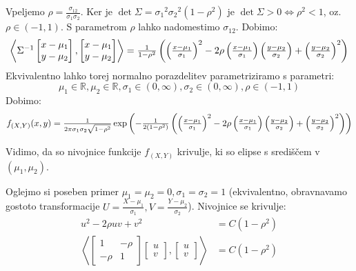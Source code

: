 \documentclass[12pt]{book}
\def\n{\noindent}
\theoremstyle{definition}
\theoremstyle{plain}
\theoremstyle{plain}
\theoremstyle{plain}
\theoremstyle{remark}
\begin{document}
\n Vpeljemo $\rho=\frac{\sigma_{12}}{\sigma_1 \sigma_2}$. Ker je $\det \Sigma=\sigma_1{ }^2 \sigma_2{ }^2\left(1-\rho^2\right)$ je $\det \Sigma >0 \iff \rho^2<1$, oz. $\rho \in(-1,1)$. S parametrom $\rho$ lahko nadomestimo $\sigma_{12}$. Dobimo: 
$$
\scalebox{1}{$\left\langle\Sigma^{-1}\begin{bmatrix} x - \mu_1 \\ y - \mu_2 \end{bmatrix},\begin{bmatrix} x - \mu_1 \\ y - \mu_2 \end{bmatrix}\right\rangle = \frac{1}{1-\rho^2}\left(\left(\frac{x-\mu_1}{\sigma_1}\right)^2-2 \rho\left(\frac{x-\mu_1}{\sigma_1}\right)\left(\frac{y-\mu_2}{\sigma_2}\right)+\left(\frac{y-\mu_2}{\sigma_2}\right)^2\right)$}
$$
Ekvivalentno lahko torej normalno porazdelitev parametriziramo s parametri:
$$
\mu_1 \in \mathbb{R}, \mu_2 \in \mathbb{R}, \sigma_1 \in(0, \infty), \sigma_2 \in(0, \infty), \rho \in(-1,1)
$$
Dobimo: 
$$
\scalebox{1}{$f_{(X, Y)}(x, y)=\frac{1}{2 \pi \sigma_1 \sigma_2 \sqrt{1-\rho^2}} \exp\left(-\frac{1}{2\left(1-\rho^2\right)}\left(\left(\frac{x-\mu_1}{\sigma_1}\right)^2-2 \rho\left(\frac{x-\mu_1}{\sigma_1}\right)\left(\frac{y-\mu_2}{\sigma_2}\right)+\left(\frac{y-\mu_2}{\sigma_2}\right)^2\right)\right)$}
$$

\n Vidimo, da so nivojnice funkcije $f_{(X,Y)}$ krivulje, ki so elipse s središčem v $(\mu_1, \mu_2)$.

\n Oglejmo si poseben primer $\mu_1=\mu_2=0, \sigma_1=\sigma_2=1$ (ekvivalentno, obravnavamo gostoto transformacije $U=\frac{X-\mu_1}{\sigma_1}, V=\frac{Y-\mu_2}{\sigma_2}$). Nivojnice se krivulje: 
$$
\begin{aligned}
    u^2-2 \rho u v+v^2&=C\left(1-\rho^2\right) \\ 
    \left\langle\begin{bmatrix} 1 & -\rho \\ -\rho & 1 \end{bmatrix} \begin{bmatrix} u \\ v \end{bmatrix},\begin{bmatrix} u \\ v \end{bmatrix}\right\rangle&=C\left(1-\rho^2\right)
\end{aligned}
$$

\newpage
\end{document}
